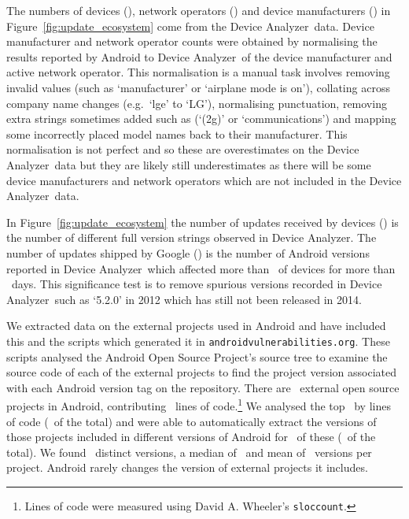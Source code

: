 \documentclass[conference,a4paper,twoside]{IEEEtran}
\newcommand{\da}{Device Analyzer}
\newcommand{\avo}{\texttt{androidvulnerabilities.org}}
\begin{document}
The numbers of devices (\daNumOSDevices), network operators (\daNumOperators) and device manufacturers (\daNumManufacturers) in Figure~\ref{fig:update_ecosystem} come from the \da\ data.
Device manufacturer and network operator counts were obtained by normalising the results reported by Android to \da\ of the device manufacturer and active network operator.
This normalisation is a manual task involves removing invalid values (such as `manufacturer' or `airplane mode is on'), collating across company name changes (e.g.\ `lge' to `LG'), normalising punctuation, removing extra strings sometimes added such as (`(2g)' or `communications') and mapping some incorrectly placed model names back to their manufacturer.
This normalisation is not perfect and so these are overestimates on the \da\ data but they are likely still underestimates as there will be some device manufacturers and network operators which are not included in the \da\ data.

In Figure~\ref{fig:update_ecosystem} the number of updates received by devices (\daNumFullVersions) is the number of different full version strings observed in \da.
The number of updates shipped by Google (\daNumSigOSVersions) is the number of Android versions reported in \da\ which affected more than \daSigVersionPerc\ of devices for more than \daSigVersionDays\ days.
This significance test is to remove spurious versions recorded in \da\ such as `5.2.0' in 2012 which has still not been released in 2014.

We extracted data on the external projects used in Android and have included this and the scripts which generated it in \avo.
These scripts analysed the Android Open Source Project's source tree to examine the source code of each of the external projects to find the project version associated with each Android version tag on the repository.
There are \avoNumExternalProjects\ external open source projects in Android, contributing \avoTotalExternalLines\ lines of code.\footnote{Lines of code were measured using David A. Wheeler's \texttt{sloccount}.}
We analysed the top \avoNumBigExternalProjects\ by lines of code (\avoBigExternalLinesOfCodePerc\ of the total) and were able to automatically extract the versions of those projects included in different versions of Android for \avoNumAnalysedExternalProjects\ of these (\avoAnalysedExternalLinesOfCodePerc\ of the total).
We found \avoBigExternalTotalVersions\ distinct versions, a median of \avoBigExternalMedianVersions\ and mean of \avoBigExternalMeanVersions\ versions per project.
Android rarely changes the version of external projects it includes.
\end{document}
